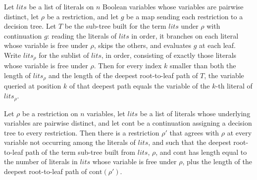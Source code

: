 \begin{lemma}
\label{SwitchingLemma.termSubTree_deepPath_var_match}
\leanok
{}
Let $\mathit{lits}$ be a list of literals on $n$ Boolean variables whose variables are
pairwise distinct, let $\rho$ be a restriction, and let $g$ be a map sending each
restriction to a decision tree. Let $T$ be the sub-tree built for the term
$\mathit{lits}$ under $\rho$ with continuation $g$: reading the literals of
$\mathit{lits}$ in order, it branches on each literal whose variable is free under
$\rho$, skips the others, and evaluates $g$ at each leaf. Write $\mathit{lits}_\rho$ for
the sublist of $\mathit{lits}$, in order, consisting of exactly those literals whose
variable is free under $\rho$. Then for every index $k$ smaller than both the length of
$\mathit{lits}_\rho$ and the length of the deepest root-to-leaf path of $T$, the
variable queried at position $k$ of that deepest path equals the variable of the $k$-th
literal of $\mathit{lits}_\rho$.
\end{lemma}

\begin{lemma}
\label{SwitchingLemma.termSubTree_deepPath_append}
\leanok
{}
Let $\rho$ be a restriction on $n$ variables, let $\mathit{lits}$ be a list of literals
whose underlying variables are pairwise distinct, and let $\mathrm{cont}$ be a
continuation assigning a decision tree to every restriction. Then there is a restriction
$\rho'$ that agrees with $\rho$ at every variable not occurring among the literals of
$\mathit{lits}$, and such that the deepest root-to-leaf path of the term sub-tree built
from $\mathit{lits}$, $\rho$, and $\mathrm{cont}$ has length equal to the number of
literals in $\mathit{lits}$ whose variable is free under $\rho$, plus the length of the
deepest root-to-leaf path of $\mathrm{cont}(\rho')$.
\end{lemma}

